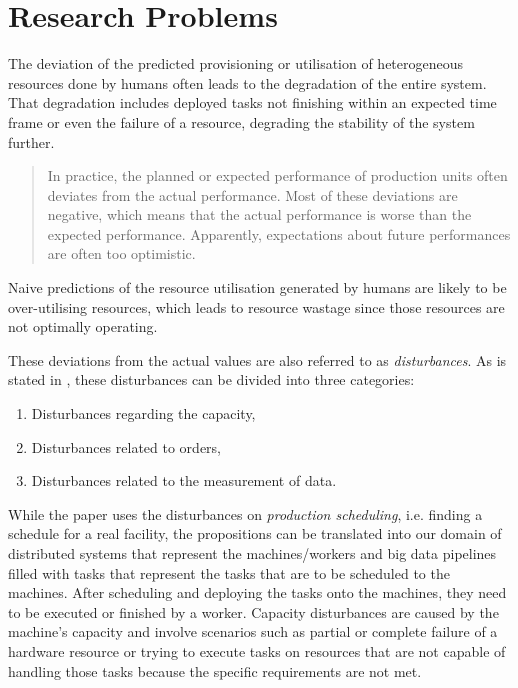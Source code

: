         \section{Research Problems}
        \label{sec:research-problems-introduction}

        The deviation of the predicted provisioning or utilisation of heterogeneous resources done by humans often leads to the degradation of the entire system. That degradation includes deployed tasks not finishing within an expected time frame or even the failure of a resource, degrading the stability of the system further.
        \begin{quote}
            In practice, the planned or expected performance of production units often deviates from the actual performance. Most of these deviations are negative, which means that the actual performance is worse than the expected performance. Apparently, expectations about future performances are often too optimistic. \cite{stoopComplexitySchedulingPractice1996}
        \end{quote}
        Naive predictions of the resource utilisation generated by humans are likely to be over-utilising resources, which leads to resource wastage since those resources are not optimally operating. 
        
        These deviations from the actual values are also referred to as \emph{disturbances}.
        As is stated in \cite{stoopComplexitySchedulingPractice1996}, these disturbances can be divided into three categories:
        \begin{enumerate}
            \item Disturbances regarding the capacity,
            \item Disturbances related to orders,
            \item Disturbances related to the measurement of data.
        \end{enumerate}
        While the paper uses the disturbances on \emph{production scheduling}, i.e. finding a schedule for a real facility, the propositions can be translated into our domain of distributed systems that represent the machines/workers and big data pipelines filled with tasks that represent the tasks that are to be scheduled to the machines. After scheduling and deploying the tasks onto the machines, they need to be executed or finished by a worker.
        Capacity disturbances are caused by the machine's capacity and involve scenarios such as partial or complete failure of a hardware resource or trying to execute tasks on resources that are not capable of handling those tasks because the specific requirements are not met. 
        
